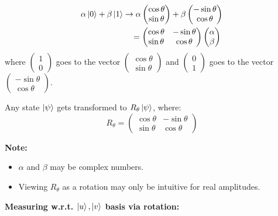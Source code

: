 \begin{definition}
\begin{align*}
\alpha\ket{0} + \beta\ket{1} &\to \alpha\begin{pmatrix} \cos\theta \\ \sin\theta \end{pmatrix} + \beta\begin{pmatrix} -\sin\theta \\ \cos\theta \end{pmatrix}\\
&\quad= \begin{pmatrix} \cos\theta & -\sin\theta \\ \sin\theta & \cos\theta \end{pmatrix} \begin{pmatrix} \alpha \\ \beta \end{pmatrix}
\
\end{align*}
where $\begin{pmatrix} 1 \\ 0 \end{pmatrix}$ goes to the vector $\begin{pmatrix} \cos\theta \\ \sin\theta \end{pmatrix}$ and $\begin{pmatrix} 0 \\ 1 \end{pmatrix}$ goes to the vector $\begin{pmatrix} -\sin\theta \\ \cos\theta \end{pmatrix}$.

Any state $\ket{\psi}$ gets transformed to $R_\theta\ket{\psi}$, where:
$$R_\theta = \begin{pmatrix} \cos\theta & -\sin\theta \\ \sin\theta & \cos\theta \end{pmatrix}$$

\textbf{Note:} 
\begin{itemize}
\item $\alpha$ and $\beta$ may be complex numbers.
\item Viewing $R_\theta$ as a rotation may only be intuitive for real amplitudes.
\end{itemize}
\end{definition}

\textbf{Measuring w.r.t. $\ket{u}, \ket{v}$ basis via rotation:}

